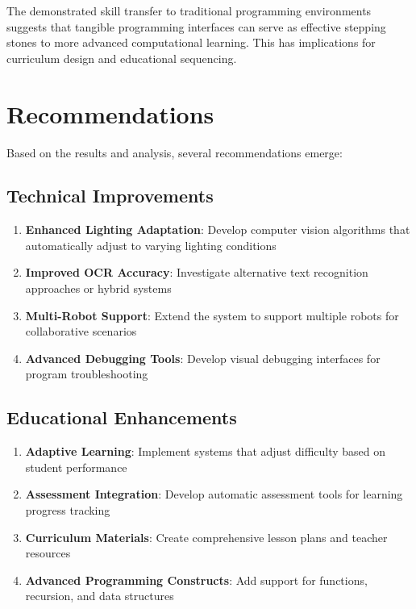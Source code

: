 The demonstrated skill transfer to traditional programming environments suggests that tangible programming interfaces can serve as effective stepping stones to more advanced computational learning. This has implications for curriculum design and educational sequencing.

\section{Recommendations}

Based on the results and analysis, several recommendations emerge:

\subsection{Technical Improvements}

\begin{enumerate}
    \item \textbf{Enhanced Lighting Adaptation}: Develop computer vision algorithms that automatically adjust to varying lighting conditions
    \item \textbf{Improved OCR Accuracy}: Investigate alternative text recognition approaches or hybrid systems
    \item \textbf{Multi-Robot Support}: Extend the system to support multiple robots for collaborative scenarios
    \item \textbf{Advanced Debugging Tools}: Develop visual debugging interfaces for program troubleshooting
\end{enumerate}

\subsection{Educational Enhancements}

\begin{enumerate}
    \item \textbf{Adaptive Learning}: Implement systems that adjust difficulty based on student performance
    \item \textbf{Assessment Integration}: Develop automatic assessment tools for learning progress tracking
    \item \textbf{Curriculum Materials}: Create comprehensive lesson plans and teacher resources
    \item \textbf{Advanced Programming Constructs}: Add support for functions, recursion, and data structures
\end{enumerate}

